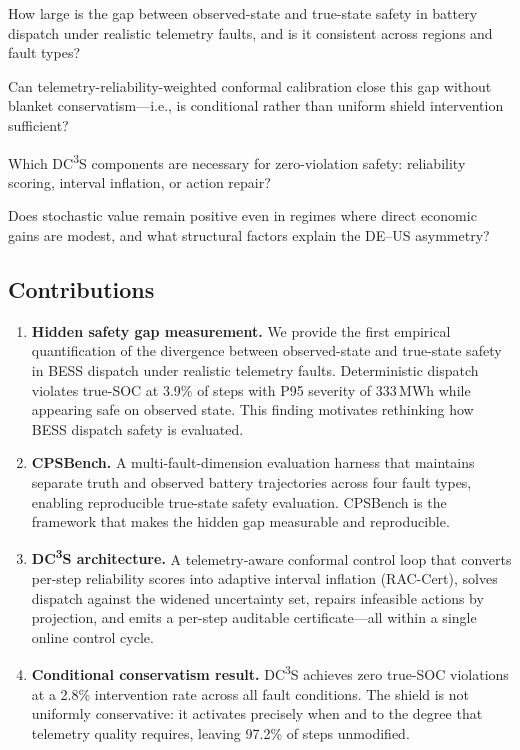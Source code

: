 \documentclass[11pt,a4paper]{article}
\begin{document}
\begin{description}[leftmargin=1em,topsep=2pt,itemsep=1pt]
  \item[\textbf{RQ1}] How large is the gap between observed-state and true-state safety in battery dispatch under realistic telemetry faults, and is it consistent across regions and fault types?
  \item[\textbf{RQ2}] Can telemetry-reliability-weighted conformal calibration close this gap without blanket conservatism---i.e., is conditional rather than uniform shield intervention sufficient?
  \item[\textbf{RQ3}] Which DC\textsuperscript{3}S components are necessary for zero-violation safety: reliability scoring, interval inflation, or action repair?
  \item[\textbf{RQ4}] Does stochastic value remain positive even in regimes where direct economic gains are modest, and what structural factors explain the DE--US asymmetry?
\end{description}

\subsection{Contributions}

\begin{enumerate}[leftmargin=*,topsep=2pt,itemsep=1pt]
  \item \textbf{Hidden safety gap measurement.} We provide the first empirical quantification of the divergence between observed-state and true-state safety in BESS dispatch under realistic telemetry faults. Deterministic dispatch violates true-SOC at 3.9\% of steps with P95 severity of 333\,MWh while appearing safe on observed state. This finding motivates rethinking how BESS dispatch safety is evaluated.
  \item \textbf{CPSBench.} A multi-fault-dimension evaluation harness that maintains separate truth and observed battery trajectories across four fault types, enabling reproducible true-state safety evaluation. CPSBench is the framework that makes the hidden gap measurable and reproducible.
  \item \textbf{DC\textsuperscript{3}S architecture.} A telemetry-aware conformal control loop that converts per-step reliability scores into adaptive interval inflation (RAC-Cert), solves dispatch against the widened uncertainty set, repairs infeasible actions by projection, and emits a per-step auditable certificate---all within a single online control cycle.
  \item \textbf{Conditional conservatism result.} DC\textsuperscript{3}S achieves zero true-SOC violations at a 2.8\% intervention rate across all fault conditions. The shield is not uniformly conservative: it activates precisely when and to the degree that telemetry quality requires, leaving 97.2\% of steps unmodified.
\end{enumerate}
\end{document}
